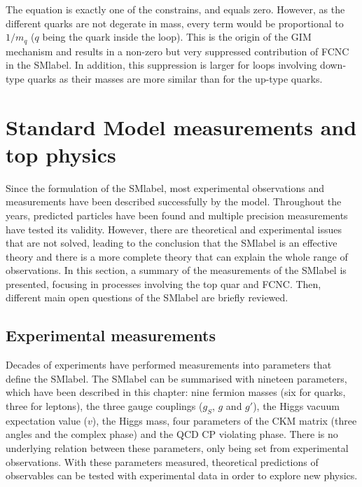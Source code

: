 The equation is exactly one of the constrains, and equals zero.  However, as the different quarks are not degerate in mass, every term would be proportional to $1/m_q$ ($q$ being the quark inside the loop). This is the origin of the GIM mechanism and results in a non-zero but very suppressed contribution of FCNC in the \acrshort{SMlabel}. In addition, this suppression is larger for loops involving down-type quarks as their masses are more similar than for the up-type quarks.

\section{Standard Model measurements and top physics}

Since the formulation of the \acrshort{SMlabel}, most experimental observations and measurements have been described successfully by the model. Throughout the years, predicted particles have been found and multiple precision measurements have tested its validity. However, there are theoretical and experimental issues that are not solved, leading to the conclusion that the \acrshort{SMlabel} is an effective theory and there is a more complete theory that can explain the whole range of observations. In this section, a summary of the measurements of the \acrshort{SMlabel} is presented, focusing in processes involving the top quar and FCNC. Then, different main open questions of the \acrshort{SMlabel} are briefly reviewed.

\subsection{Experimental measurements}

Decades of experiments have performed measurements into parameters that define the \acrshort{SMlabel}. The \acrshort{SMlabel} can be summarised with nineteen parameters, which have been described in this chapter: nine fermion masses (six for quarks, three for leptons), the three gauge couplings ($g_S$, $g$ and $g'$), the Higgs vacuum expectation value ($v$), the Higgs mass, four parameters of the CKM matrix (three angles and the complex phase) and the \acrshort{QCD} CP violating phase. There is no underlying relation between these parameters, only being set from experimental observations. With these parameters measured, theoretical predictions of observables can be tested with experimental data in order to explore new physics.\\

